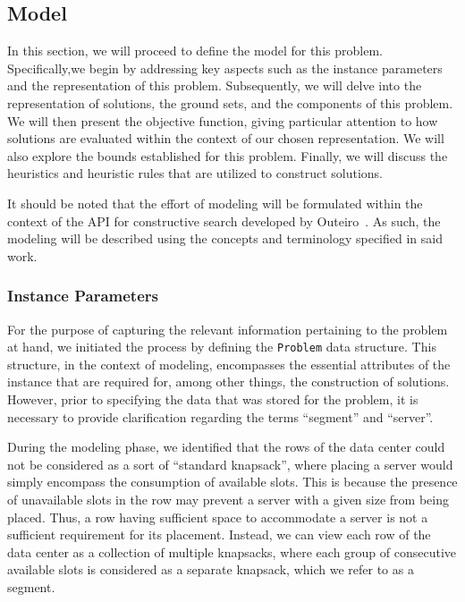 \subsection{Model} \label{section:data-center-model}

In this section, we will proceed to define the model for this problem.
Specifically,we begin by addressing key aspects such as the instance parameters
and the representation of this problem. Subsequently, we will delve into the
representation of solutions, the ground sets, and the components of this problem.
We will then present the objective function, giving particular attention to how
solutions are evaluated within the context of our chosen representation. We will
also explore the bounds established for this problem. Finally, we will discuss
the heuristics and heuristic rules that are utilized to construct solutions.

It should be noted that the effort of modeling will be formulated within the
context of the API for constructive search developed by
Outeiro~\cite{outeiro2021application}. As such, the modeling will be described
using the concepts and terminology specified in said work.

\subsubsection{Instance Parameters} \label{section:data-center-representation}

For the purpose of capturing the relevant information pertaining to the problem
at hand, we initiated the process by defining the \texttt{Problem} data
structure. This structure, in the context of modeling, encompasses the essential
attributes of the instance that are required for, among other things, the
construction of solutions. However, prior to specifying the data that was stored
for the problem, it is necessary to provide clarification regarding the terms
``segment'' and ``server''.

During the modeling phase, we identified that the rows of the data center could
not be considered as a sort of ``standard knapsack'', where placing a server
would simply encompass the consumption of available slots. This is because the
presence of unavailable slots in the row may prevent a server with a given size
from being placed. Thus, a row having sufficient space to accommodate a server
is not a sufficient requirement for its placement. Instead, we can view each row
of the data center as a collection of multiple knapsacks, where each group of
consecutive available slots is considered as a separate knapsack, which we refer
to as a segment.

